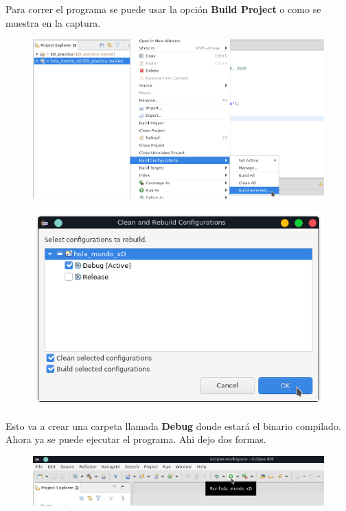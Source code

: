\documentclass{article}
\begin{document}
\newpage

Para correr el programa se puede usar la opción \textbf{Build Project} o como
se muestra en la captura.

\begin{figure}[h!]
  \centering
  \includegraphics[scale=0.65]{./Pictures/028_build_selected.png}
\end{figure}

\begin{figure}[h!]
  \centering
  \includegraphics[scale=0.75]{./Pictures/029_clean_rebuild.png}
\end{figure}

Esto va a crear una carpeta llamada \textbf{Debug} donde estará el binario
compilado. Ahora ya se puede ejecutar el programa. Ahi dejo dos formas.

\begin{figure}[h!]
  \centering
  \includegraphics[scale=0.75]{./Pictures/029_run_bitch.png}
\end{figure}
\end{document}
